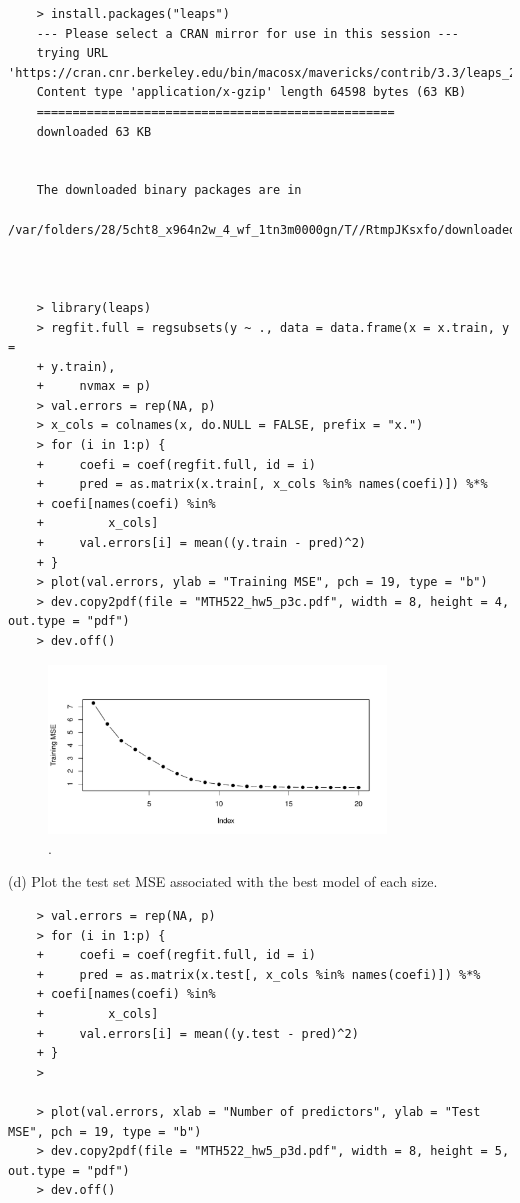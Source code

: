 \documentclass{article}
\begin{document}
\begin{program}
	\begin{verbatim}
	> install.packages("leaps")
	--- Please select a CRAN mirror for use in this session ---
	trying URL 'https://cran.cnr.berkeley.edu/bin/macosx/mavericks/contrib/3.3/leaps_2.9.tgz'
	Content type 'application/x-gzip' length 64598 bytes (63 KB)
	==================================================
	downloaded 63 KB


	The downloaded binary packages are in
	/var/folders/28/5cht8_x964n2w_4_wf_1tn3m0000gn/T//RtmpJKsxfo/downloaded_packages
	
	

	> library(leaps)
	> regfit.full = regsubsets(y ~ ., data = data.frame(x = x.train, y =
	+ y.train),
	+     nvmax = p)
	> val.errors = rep(NA, p)
	> x_cols = colnames(x, do.NULL = FALSE, prefix = "x.")
	> for (i in 1:p) {
	+     coefi = coef(regfit.full, id = i)
	+     pred = as.matrix(x.train[, x_cols %in% names(coefi)]) %*%
	+ coefi[names(coefi) %in%
	+         x_cols]
	+     val.errors[i] = mean((y.train - pred)^2)
	+ }
	> plot(val.errors, ylab = "Training MSE", pch = 19, type = "b")
	> dev.copy2pdf(file = "MTH522_hw5_p3c.pdf", width = 8, height = 4, out.type = "pdf")
	> dev.off()
	\end{verbatim}
\end{program}



\begin{figure}[htb]
	\begin{center}
		\includegraphics[width=0.8\textwidth]{MTH522_hw5_p3c.pdf}
	\end{center}
	\caption{.}
	\label{fig:MTH522_hw5_p3c}
\end{figure}

\newpage


(d) Plot the test set MSE associated with the best model of each size.


\begin{program}
	\begin{verbatim}
	> val.errors = rep(NA, p)
	> for (i in 1:p) {
	+     coefi = coef(regfit.full, id = i)
	+     pred = as.matrix(x.test[, x_cols %in% names(coefi)]) %*%
	+ coefi[names(coefi) %in%
	+         x_cols]
	+     val.errors[i] = mean((y.test - pred)^2)
	+ }
	> 

	> plot(val.errors, xlab = "Number of predictors", ylab = "Test MSE", pch = 19, type = "b")
	> dev.copy2pdf(file = "MTH522_hw5_p3d.pdf", width = 8, height = 5, out.type = "pdf")
	> dev.off()

	\end{verbatim}
\end{program}
\end{document}
